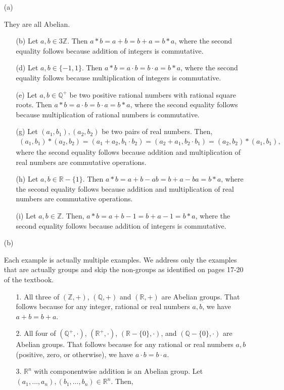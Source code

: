 \documentclass[12pt]{article}
\def\Q{{\mathbb Q}}        %
\def\Z{{\mathbb Z}}        %
\def\R{{\mathbb R}}        %
\numberwithin{theorem}{section}
\numberwithin{equation}{section}
\numberwithin{remark}{section}
\numberwithin{definition}{section}
\numberwithin{theorem}{section}
\numberwithin{lemma}{section}
\numberwithin{example}{section}
\begin{document}
\begin{itemize}
	\item[(a)]{They are all Abelian.
		\begin{itemize}
			\item[(b)]{Let $a,b\in3\Z$. Then $a*b=a+b=b+a=b*a$, where the second equality follows because addition of integers is commutative.}
			\item[(d)]{Let $a,b\in\{-1,1\}$. Then $a*b=a\cdot b = b\cdot a=b*a$, where the second equality follows because multiplication of integers is commutative.}
			\item[(e)]{Let $a,b\in\Q^+$ be two positive rational numbers with rational square roots. Then $a*b=a\cdot b = b\cdot a = b*a$, where the second equality follows because multiplication of rational numbers is commutative.}
			\item[(g)]{Let $(a_1,b_1),(a_2,b_2)$ be two pairs of real numbers. Then,
				\begin{align*}
					(a_1,b_1)*(a_2,b_2)=(a_1+a_2,b_1\cdot b_2)=(a_2+a_1,b_2\cdot b_1)=(a_2,b_2)*(a_1,b_1),
				\end{align*}
			where the second equality follows because addition and multiplication of real numbers are commutative operations.}
			\item[(h)]{Let $a,b\in\R-\{1\}$. Then $a*b=a+b-ab=b+a-ba=b*a$, where the second equality follows because addition and multiplication of real numbers are commutative operations.}
			\item[(i)]{Let $a,b\in\Z$. Then, $a*b=a+b-1=b+a-1=b*a$, where the second equality follows because addition of integers is commutative.}
		\end{itemize}}
	\item[(b)]{Each example is actually multiple examples. We address only the examples that are actually groups and skip the non-groups as identified on pages 17-20 of the textbook.
		\begin{itemize}
			\item[1.]{All three of $(\Z,+)$, $(\Q,+)$ and $(\R,+)$ are Abelian groups. That follows because for any integer, rational or real numbers $a,b$, we have $a+b=b+a$.}
			\item[2.]{All four of $(\Q^+,\cdot)$, $(\R^+,\cdot)$, $(\R-\{0\},\cdot)$, and $(\Q-\{0\},\cdot)$ are Abelian groups. That follows because for any rational or real numbers $a,b$ (positive, zero, or otherwise), we have $a\cdot b=b\cdot a$.}
			\item[3.]{$\R^n$ with componentwise addition is an Abelian group. Let $(a_1,\ldots,a_n),(b_1,\ldots,b_n)\in\R^n$. Then,
}
\end{itemize}}
\end{itemize}
\end{document}
